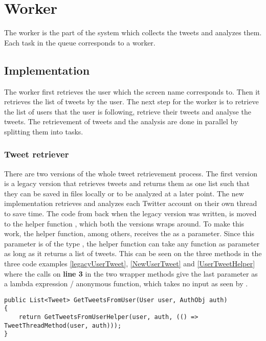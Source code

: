 \chapter{Worker}\label{workerLabel}
The worker is the part of the system which collects the tweets and analyzes
them. Each task in the queue corresponds to a worker. 

\section{Implementation}
The worker first retrieves the user which the screen name corresponds to. Then
it retrieves the list of tweets by the user. The next step for the
worker is to retrieve the list of users that the user is following, retrieve
their tweets and analyse the tweets. The retrievement of tweets and the
analysis are done in parallel by splitting them into tasks.

\subsection{Tweet retriever} \label{sub:tweetretriever}
There are two versions of the whole tweet retrievement process. The first
version is a legacy version that retrieves tweets and returns them as one list
such that they can be saved in files locally or to be analyzed at a later
point.
The new implementation retrieves and analyzes each Twitter account on their own
thread to save time. The code from back when the legacy version was written, is moved to the helper function
, which both the versions wraps around. To make
this work, the helper function, among others, receives the  as
a parameter. Since this parameter is of the type , the
helper function can take any function as parameter as long as it returns a list
of tweets.
This can be seen on the three methods in the three code examples
\autoref{legacyUserTweet}, \autoref{NewUserTweet} and
\autoref{UserTweetHelper} where the calls on \textbf{line 3} in the two
wrapper methods give the last parameter as a lambda expression / anonymous
function, which takes no input as seen by \textc{() =>}.\\

\begin{minipage}[H]{\linewidth}
\begin{lstlisting}[caption = Legacy method call , label = legacyUserTweet ] 
public List<Tweet> GetTweetsFromUser(User user, AuthObj auth)
{	
    return GetTweetsFromUserHelper(user, auth, (() => TweetThreadMethod(user, auth)));
}
\end{lstlisting}
\end{minipage}

